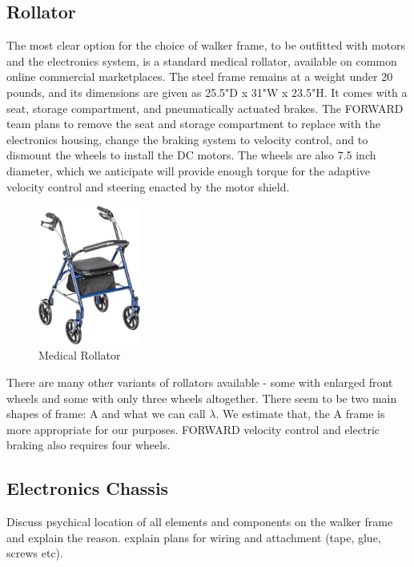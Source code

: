 \subsection{Rollator}
\noindent The most clear option for the choice of walker frame, to be outfitted with motors and the electronics system, is a standard medical rollator, available on common online commercial marketplaces. The steel frame remains at a weight under 20 pounds, and its dimensions are given as 25.5"D x 31"W x 23.5"H. It comes with a seat, storage compartment, and pneumatically actuated brakes. The FORWARD team plans to remove the seat and storage compartment to replace with the electronics housing, change the braking system to velocity control, and to dismount the wheels to install the DC motors. The wheels are also 7.5 inch diameter, which we anticipate will provide enough torque for the adaptive velocity control and steering enacted by the motor shield.\\

\begin{figure}[H]
	\centering
	\includegraphics[width=0.3\textwidth]{./Images/rollator-amaz.jpg}
	\caption{\label{fig:rollator-amaz}Medical Rollator}
\end{figure}

\noindent There are many other variants of rollators available - some with enlarged front wheels and some with only three wheels altogether. There seem to be two main shapes of frame: A and what we can call $\lambda$. We estimate that, the A frame is more appropriate for our purposes. FORWARD velocity control and electric braking also requires four wheels.\\


\subsection{Electronics Chassis}
\noindent Discuss psychical location of all elements and components on the walker frame and explain the reason. explain plans for wiring and attachment (tape, glue, screws etc).\\

